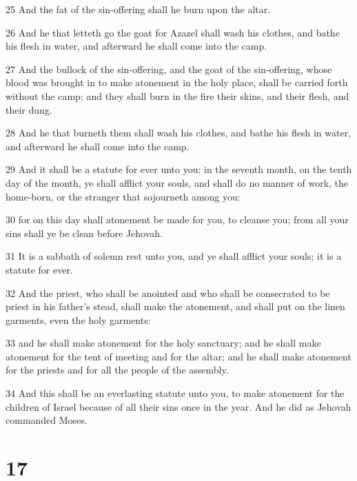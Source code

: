 \par 25 And the fat of the sin-offering shall he burn upon the altar.
\par 26 And he that letteth go the goat for Azazel shall wash his clothes, and bathe his flesh in water, and afterward he shall come into the camp.
\par 27 And the bullock of the sin-offering, and the goat of the sin-offering, whose blood was brought in to make atonement in the holy place, shall be carried forth without the camp; and they shall burn in the fire their skins, and their flesh, and their dung.
\par 28 And he that burneth them shall wash his clothes, and bathe his flesh in water, and afterward he shall come into the camp.
\par 29 And it shall be a statute for ever unto you: in the seventh month, on the tenth day of the month, ye shall afflict your souls, and shall do no manner of work, the home-born, or the stranger that sojourneth among you:
\par 30 for on this day shall atonement be made for you, to cleanse you; from all your sins shall ye be clean before Jehovah.
\par 31 It is a sabbath of solemn rest unto you, and ye shall afflict your souls; it is a statute for ever.
\par 32 And the priest, who shall be anointed and who shall be consecrated to be priest in his father's stead, shall make the atonement, and shall put on the linen garments, even the holy garments:
\par 33 and he shall make atonement for the holy sanctuary; and he shall make atonement for the tent of meeting and for the altar; and he shall make atonement for the priests and for all the people of the assembly.
\par 34 And this shall be an everlasting statute unto you, to make atonement for the children of Israel because of all their sins once in the year. And he did as Jehovah commanded Moses.

\chapter{17}

